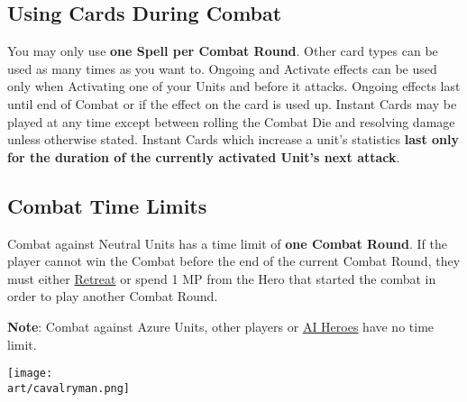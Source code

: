 \begin{multicols*}{2}
\subsection*{\hypertarget{CombatCards}{Using Cards During Combat}}
You may only use \textbf{one Spell per Combat Round}.
Other card types can be used as many times as you want to.
Ongoing  and  Activate effects can be used only when Activating one of your Units and before it attacks.
Ongoing effects last until end of Combat or if the effect on the card is used up.
Instant  Cards may be played at any time except between rolling the Combat Die and resolving damage unless otherwise stated.
Instant Cards which increase a unit's statistics \textbf{last only for the duration of the currently activated Unit's next attack}.
\subsection*{\hypertarget{Timelimit}{Combat Time Limits}}
Combat against Neutral Units has a time limit of \textbf{one Combat Round}.
If the player cannot win the Combat before the end of the current Combat Round, they must either \hyperlink{Endcombat}{Retreat} or spend 1 MP from the Hero that started the combat in order to play another Combat Round.\par
\textbf{Note}: Combat against Azure  Units, other players or \hyperlink{AIrules}{AI Heroes} have no time limit.

\vspace*{\fill}
\hspace{2em}
\texttt{[image: \\art/cavalryman.png]}

\end{multicols*}

